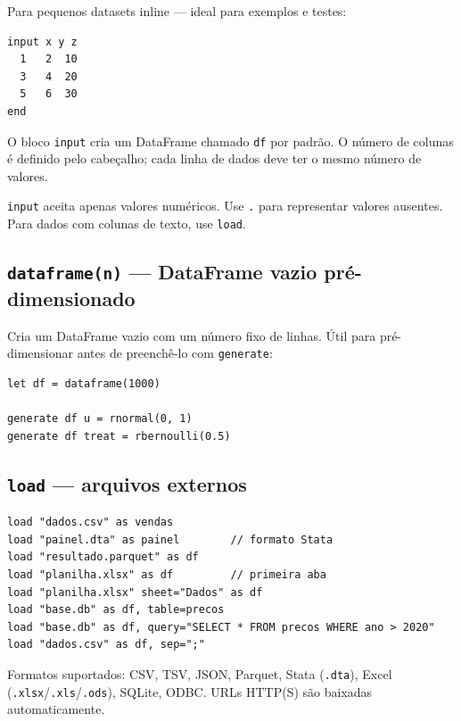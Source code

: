 Para pequenos datasets inline — ideal para exemplos e testes:

\begin{lstlisting}[caption={input block}]
input x y z
  1   2  10
  3   4  20
  5   6  30
end
\end{lstlisting}

O bloco \lstinline{input} cria um DataFrame chamado \lstinline{df} por padrão.
O número de colunas é definido pelo cabeçalho; cada linha de dados deve ter o
mesmo número de valores.

\begin{nota}
  \lstinline{input} aceita apenas valores numéricos. Use \lstinline{.} para
  representar valores ausentes. Para dados com colunas de texto, use
  \lstinline{load}.
\end{nota}

\subsection*{\texttt{dataframe(n)} — DataFrame vazio pré-dimensionado}

Cria um DataFrame vazio com um número fixo de linhas. Útil para
pré-dimensionar antes de preenchê-lo com \lstinline{generate}:

\begin{lstlisting}[caption={DataFrame pré-dimensionado}]
let df = dataframe(1000)

generate df u = rnormal(0, 1)
generate df treat = rbernoulli(0.5)
\end{lstlisting}

\subsection*{\texttt{load} — arquivos externos}

\begin{lstlisting}[caption={Carregando arquivos}]
load "dados.csv" as vendas
load "painel.dta" as painel        // formato Stata
load "resultado.parquet" as df
load "planilha.xlsx" as df         // primeira aba
load "planilha.xlsx" sheet="Dados" as df
load "base.db" as df, table=precos
load "base.db" as df, query="SELECT * FROM precos WHERE ano > 2020"
load "dados.csv" as df, sep=";"
\end{lstlisting}

Formatos suportados: CSV, TSV, JSON, Parquet, Stata (\texttt{.dta}),
Excel (\texttt{.xlsx}/\texttt{.xls}/\texttt{.ods}), SQLite, ODBC. URLs HTTP(S)
são baixadas automaticamente.

